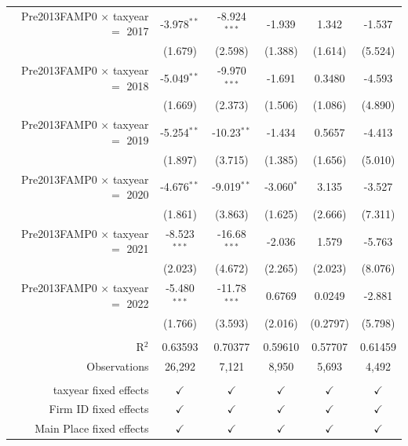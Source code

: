 {\begin{tabular}{rccccc}
   Pre2013FAMP0 $\times$ taxyear $=$ 2017  & -3.978$^{**}$  & -8.924$^{***}$ & -1.939        & 1.342         & -1.537\\   
                                           & (1.679)        & (2.598)        & (1.388)       & (1.614)       & (5.524)\\   
   Pre2013FAMP0 $\times$ taxyear $=$ 2018  & -5.049$^{**}$  & -9.970$^{***}$ & -1.691        & 0.3480        & -4.593\\   
                                           & (1.669)        & (2.373)        & (1.506)       & (1.086)       & (4.890)\\   
   Pre2013FAMP0 $\times$ taxyear $=$ 2019  & -5.254$^{**}$  & -10.23$^{**}$  & -1.434        & 0.5657        & -4.413\\   
                                           & (1.897)        & (3.715)        & (1.385)       & (1.656)       & (5.010)\\   
   Pre2013FAMP0 $\times$ taxyear $=$ 2020  & -4.676$^{**}$  & -9.019$^{**}$  & -3.060$^{*}$  & 3.135         & -3.527\\   
                                           & (1.861)        & (3.863)        & (1.625)       & (2.666)       & (7.311)\\   
   Pre2013FAMP0 $\times$ taxyear $=$ 2021  & -8.523$^{***}$ & -16.68$^{***}$ & -2.036        & 1.579         & -5.763\\   
                                           & (2.023)        & (4.672)        & (2.265)       & (2.023)       & (8.076)\\   
   Pre2013FAMP0 $\times$ taxyear $=$ 2022  & -5.480$^{***}$ & -11.78$^{***}$ & 0.6769        & 0.0249        & -2.881\\   
                                           & (1.766)        & (3.593)        & (2.016)       & (0.2797)      & (5.798)\\   
    \\
   R$^2$                                   & 0.63593        & 0.70377        & 0.59610       & 0.57707       & 0.61459\\  
   Observations                            & 26,292         & 7,121          & 8,950         & 5,693         & 4,492\\  
    \\
   taxyear fixed effects                   & $\checkmark$   & $\checkmark$   & $\checkmark$  & $\checkmark$  & $\checkmark$\\   
   Firm ID fixed effects                   & $\checkmark$   & $\checkmark$   & $\checkmark$  & $\checkmark$  & $\checkmark$\\   
   Main Place fixed effects                & $\checkmark$   & $\checkmark$   & $\checkmark$  & $\checkmark$  & $\checkmark$\\   
   \bottomrule
\end{tabular}
}
